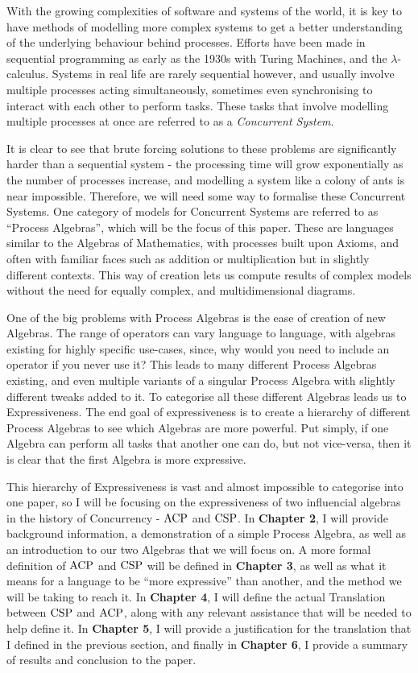 \documentclass[../hons_project.tex]{subfiles}
\begin{document}
With the growing complexities of software and systems of the world, it is key to have methods of modelling more complex systems to get a better understanding of the underlying behaviour behind processes. Efforts have been made in sequential programming as early as the 1930s with Turing Machines, and the $\lambda$-calculus. Systems in real life are rarely sequential however, and usually involve multiple processes acting simultaneously, sometimes even synchronising to interact with each other to perform tasks. These tasks that involve modelling multiple processes at once are referred to as a \textit{Concurrent System}. 

It is clear to see that brute forcing solutions to these problems are significantly harder than a sequential system - the processing time will grow exponentially as the number of processes increase, and modelling a system like a colony of ants is near impossible. Therefore, we will need some way to formalise these Concurrent Systems. One category of models for Concurrent Systems are referred to as ``Process Algebras'', which will be the focus of this paper. These are languages similar to the Algebras of Mathematics, with processes built upon Axioms, and often with familiar faces such as addition or multiplication but in slightly different contexts. This way of creation lets us compute results of complex models without the need for equally complex, and multidimensional diagrams.

One of the big problems with Process Algebras is the ease of creation of new Algebras. The range of operators can vary language to language, with algebras existing for highly specific use-cases, since, why would you need to include an operator if you never use it? This leads to many different Process Algebras existing, and even multiple variants of a singular Process Algebra with slightly different tweaks added to it. To categorise all these different Algebras leads us to Expressiveness. The end goal of expressiveness is to create a hierarchy of different Process Algebras to see which Algebras are more powerful. Put simply, if one Algebra can perform all tasks that another one can do, but not vice-versa, then it is clear that the first Algebra is more expressive.

This hierarchy of Expressiveness is vast and almost impossible to categorise into one paper, so I will be focusing on the expressiveness of two influencial algebras in the history of Concurrency - $\mathrm{ACP}$ and $\mathrm{CSP}$. In \textbf{Chapter 2}, I will provide background information, a demonstration of a simple Process Algebra, as well as an introduction to our two Algebras that we will focus on. A more formal definition of $\mathrm{ACP}$ and $\mathrm{CSP}$ will be defined in \textbf{Chapter 3}, as well as what it means for a language to be ``more expressive'' than another, and the method we will be taking to reach it. In \textbf{Chapter 4}, I will define the actual Translation between $\mathrm{CSP}$ and $\mathrm{ACP}$, along with any relevant assistance that will be needed to help define it. In \textbf{Chapter 5}, I will provide a justification for the translation that I defined in the previous section, and finally in \textbf{Chapter 6}, I provide a summary of results and conclusion to the paper.
\end{document}

